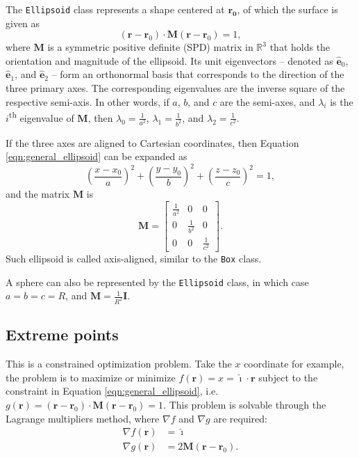 The \lstinline|Ellipsoid| class represents a shape centered at $\bm{r_0}$, of which the surface is given as
\begin{equation}
    (\bm{r} - \bm{r}_0) \cdot \bm{M}(\bm{r} - \bm{r}_0) = 1,
    \label{eqn:general_ellipsoid}
\end{equation}
where $\bm{M}$ is a symmetric positive definite (SPD) matrix in $\mathbb{R}^3$ that holds the orientation and magnitude of the ellipsoid. Its unit eigenvectors -- denoted as  $\bm{\hat{e}}_0$, $\bm{\hat{e}}_1$, and
$\bm{\hat{e}}_2$ -- form an orthonormal basis that corresponds to the direction of the three primary axes. The corresponding eigenvalues are the inverse square of the respective semi-axis. In other words, if $a$, $b$,
and $c$ are the semi-axes, and $\lambda_i$ is the $i$\textsuperscript{th} eigenvalue of $\bm{M}$, then $\displaystyle \lambda_0 = \frac{1}{a^2}$, $\displaystyle \lambda_1 = \frac{1}{b^2}$, and $\displaystyle \lambda_2 = \frac{1}{c^2}$.

If the three axes are aligned to Cartesian coordinates, then Equation \ref{eqn:general_ellipsoid} can be expanded as
\begin{equation}
    \left( \frac{x - x_0}{a} \right)^2 + \left( \frac{y - y_0}{b} \right)^2 + \left( \frac{z - z_0}{c} \right)^2 = 1,
    \label{eqn:axis_aligned_ellipsoid}
\end{equation}
and the matrix $\bm{M}$ is
\begin{equation}
    \bm{M} =
    \begin{bmatrix}
        \frac{1}{a^2} & 0 & 0 \\
        0 & \frac{1}{b^2} & 0 \\
        0 & 0 & \frac{1}{c^2}
    \end{bmatrix}.
\end{equation}
Such ellipsoid is called axis-aligned, similar to the \lstinline{Box} class.

A sphere can also be represented by the \lstinline|Ellipsoid| class, in which case $a = b = c = R$, and $\bm{M} = \displaystyle \frac{1}{R^2} \bm{I}$.

\subsection{Extreme points}
This is a constrained optimization problem. Take the $x$ coordinate for example, the problem is to maximize or minimize $f(\bm{r}) = x = \bm{\hat{\imath}} \cdot \bm{r}$ subject to the constraint in Equation
\ref{eqn:general_ellipsoid}, i.e. $g(\bm{r}) = (\bm{r} - \bm{r}_0) \cdot \bm{M}(\bm{r} - \bm{r}_0) = 1$. This problem is solvable through the Lagrange multipliers method, where $\nabla f$ and $\nabla g$ are required:
\begin{align}
    \nabla f(\bm{r}) &= \bm{\hat{\imath}} \\
    \nabla g(\bm{r}) &= 2\bm{M}(\bm{r} - \bm{r}_0).
\end{align}

